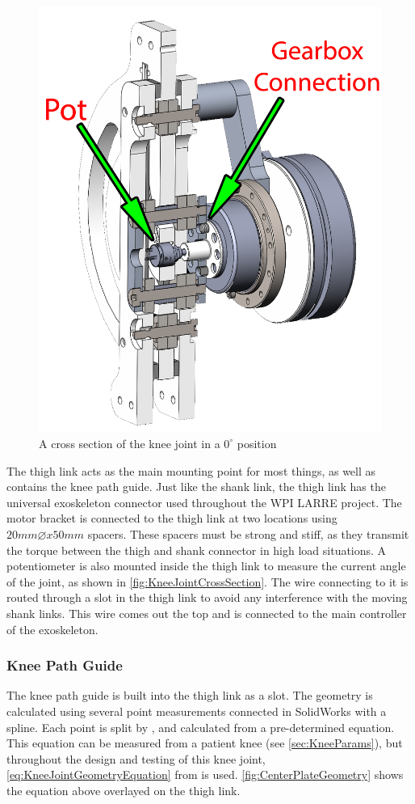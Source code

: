 \begin{figure}[ht!]
    \centering
    \includegraphics[width=0.7\linewidth]{Figures/Design/KneeJointAssyCrossSection_edit.png}
    \caption{A cross section of the knee joint in a \(0^\circ\) position}
    \label{fig:KneeJointCrossSection}
\end{figure}

The thigh link acts as the main mounting point for most things, as well as contains the knee path guide. Just like the shank link, the thigh link has the universal exoskeleton connector used throughout the WPI LARRE project. The motor bracket is connected to the thigh link at two locations using \(20mm\diameter x 50mm\) spacers. These spacers must be strong and stiff, as they transmit the torque between the thigh and shank connector in high load situations. A potentiometer is also mounted inside the thigh link to measure the current angle of the joint, as shown in \autoref{fig:KneeJointCrossSection}. The wire connecting to it is routed through a slot in the thigh link to avoid any interference with the moving shank links. This wire comes out the top and is connected to the main controller of the exoskeleton.

\subsubsection{Knee Path Guide}
The knee path guide is built into the thigh link as a slot. The geometry is calculated using several point measurements connected in SolidWorks with a spline. Each point is split by , and calculated from a pre-determined equation. This equation can be measured from a patient knee (see \autoref{sec:KneeParams}), but throughout the design and testing of this knee joint, \autoref{eq:KneeJointGeometryEquation} from \cite{KinDynKneeJoint} is used. \autoref{fig:CenterPlateGeometry} shows the equation above overlayed on the thigh link.

